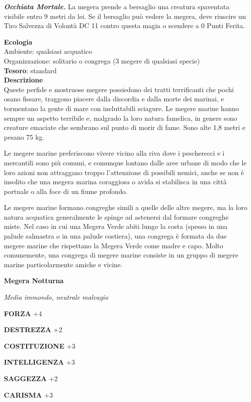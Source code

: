 \begin{multicols}{2}
\textit{\textbf{Occhiata Mortale.}} La megera prende a bersaglio una creatura spaventata visibile entro 9 metri da lei. Se il bersaglio può vedere la megera, deve riuscire un Tiro Salvezza di Volontà DC 11 contro questa magia o scendere a 0 Punti Ferita.

\textbf{Ecologia}\\
Ambiente: qualsiasi acquatico\\
Organizzazione: solitario o congrega (3 megere di qualsiasi specie)\\
\textbf{Tesoro}: standard\\
\textbf{Descrizione}\\
Queste perfide e mostruose megere possiedono dei tratti terrificanti che pochi osano fissare, traggono piacere dalla discordia e dalla morte dei marinai, e tormentano la gente di mare con ineluttabili sciagure. Le megere marine hanno sempre un aspetto terribile e, malgrado la loro natura famelica, in genere sono creature emaciate che sembrano sul punto di morir di fame. Sono alte 1,8 metri e pesano 75 kg.

Le megere marine preferiscono vivere vicino alla riva dove i pescherecci e i mercantili sono più comuni, e comunque lontano dalle aree urbane di modo che le loro azioni non attraggano troppo l'attenzione di possibili nemici, anche se non è insolito che una megera marina coraggiosa o avida si stabilisca in una città portuale o alla foce di un fiume profondo.

Le megere marine formano congreghe simili a quelle delle altre megere, ma la loro natura acquatica generalmente le spinge ad astenersi dal formare congreghe miste. Nel caso in cui una Megera Verde abiti lungo la costa (spesso in una palude salmastra o in una palude costiera), una congrega è formata da due megere marine che rispettano la Megera Verde come madre e capo. Molto comunemente, una congrega di megere marine consiste in un gruppo di megere marine particolarmente amiche e vicine.


\medskip{}\textbf{Megera Notturna}

\textit{Media immondo, neutrale malvagio}

\textbf{FORZA} +4

\textbf{DESTREZZA} +2

\textbf{COSTITUZIONE} +3

\textbf{INTELLIGENZA} +3

\textbf{SAGGEZZA} +2

\textbf{CARISMA} +3


\end{multicols}
